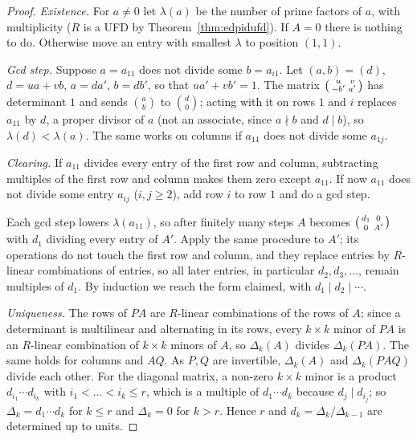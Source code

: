 \begin{proof}
\emph{Existence.} For $a\ne0$ let $\lambda(a)$ be the number of prime factors of $a$, with multiplicity ($R$ is a UFD by Theorem~\ref{thm:edpidufd}). If $A=0$ there is nothing to do. Otherwise move an entry with smallest $\lambda$ to position $(1,1)$.

\emph{Gcd step.} Suppose $a=a_{11}$ does not divide some $b=a_{i1}$. Let $(a,b)=(d)$, $d=ua+vb$, $a=da'$, $b=db'$, so that $ua'+vb'=1$. The matrix $\begin{psmallmatrix}u&v\\-b'&a'\end{psmallmatrix}$ has determinant $1$ and sends $\binom ab$ to $\binom d0$; acting with it on rows $1$ and $i$ replaces $a_{11}$ by $d$, a proper divisor of $a$ (not an associate, since $a\nmid b$ and $d\mid b$), so $\lambda(d)<\lambda(a)$. The same works on columns if $a_{11}$ does not divide some $a_{1j}$.

\emph{Clearing.} If $a_{11}$ divides every entry of the first row and column, subtracting multiples of the first row and column makes them zero except $a_{11}$. If now $a_{11}$ does not divide some entry $a_{ij}$ ($i,j\ge2$), add row $i$ to row $1$ and do a gcd step.

Each gcd step lowers $\lambda(a_{11})$, so after finitely many steps $A$ becomes $\begin{psmallmatrix}d_1&0\\0&A'\end{psmallmatrix}$ with $d_1$ dividing every entry of $A'$. Apply the same procedure to $A'$; its operations do not touch the first row and column, and they replace entries by $R$-linear combinations of entries, so all later entries, in particular $d_2,d_3,\dots$, remain multiples of $d_1$. By induction we reach the form claimed, with $d_1\mid d_2\mid\cdots$.

\emph{Uniqueness.} The rows of $PA$ are $R$-linear combinations of the rows of $A$; since a determinant is multilinear and alternating in its rows, every $k\times k$ minor of $PA$ is an $R$-linear combination of $k\times k$ minors of $A$, so $\Delta_k(A)$ divides $\Delta_k(PA)$. The same holds for columns and $AQ$. As $P,Q$ are invertible, $\Delta_k(A)$ and $\Delta_k(PAQ)$ divide each other. For the diagonal matrix, a non-zero $k\times k$ minor is a product $d_{i_1}\cdots d_{i_k}$ with $i_1<\dots<i_k\le r$, which is a multiple of $d_1\cdots d_k$ because $d_j\mid d_{i_j}$; so $\Delta_k=d_1\cdots d_k$ for $k\le r$ and $\Delta_k=0$ for $k>r$. Hence $r$ and $d_k=\Delta_k/\Delta_{k-1}$ are determined up to units.
\end{proof}

